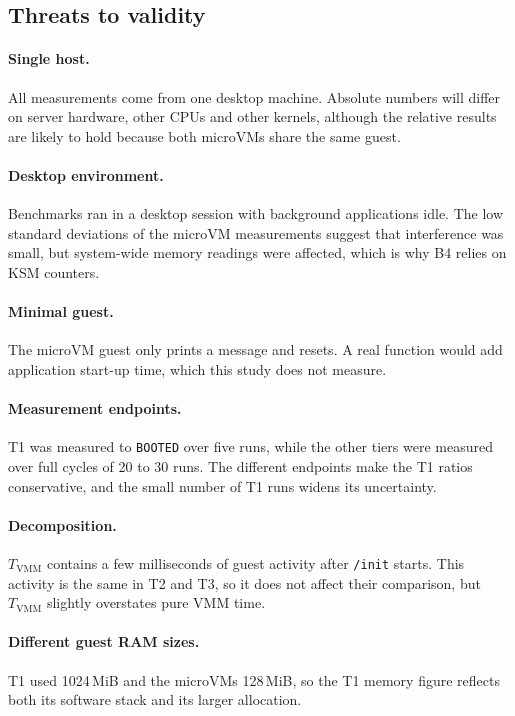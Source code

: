 \documentclass[pdflatex,sn-mathphys-num]{sn-jnl}%
\begin{document}
\subsection{Threats to validity}

\paragraph{Single host.} All measurements come from one desktop machine. Absolute numbers will differ on server hardware, other CPUs and other kernels, although the relative results are likely to hold because both microVMs share the same guest.

\paragraph{Desktop environment.} Benchmarks ran in a desktop session with background applications idle. The low standard deviations of the microVM measurements suggest that interference was small, but system-wide memory readings were affected, which is why B4 relies on KSM counters.

\paragraph{Minimal guest.} The microVM guest only prints a message and resets. A real function would add application start-up time, which this study does not measure.

\paragraph{Measurement endpoints.} T1 was measured to \texttt{BOOTED} over five runs, while the other tiers were measured over full cycles of 20 to 30 runs. The different endpoints make the T1 ratios conservative, and the small number of T1 runs widens its uncertainty.

\paragraph{Decomposition.} $T_{\mathrm{VMM}}$ contains a few milliseconds of guest activity after \texttt{/init} starts. This activity is the same in T2 and T3, so it does not affect their comparison, but $T_{\mathrm{VMM}}$ slightly overstates pure VMM time.

\paragraph{Different guest RAM sizes.} T1 used 1024\,MiB and the microVMs 128\,MiB, so the T1 memory figure reflects both its software stack and its larger allocation.
\end{document}
